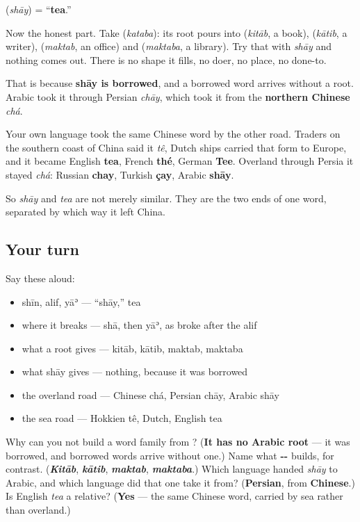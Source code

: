 \begin{cousinweb}
\textbf{} (\emph{shāy}) = \textquotedblleft{}\textbf{tea}.\textquotedblright{}

Now the honest part. Take \textbf{} (\emph{kataba}): its root pours into \textbf{} (\emph{kitāb}, a book), \textbf{} (\emph{kātib}, a writer), \textbf{} (\emph{maktab}, an office) and \textbf{} (\emph{maktaba}, a library). Try that with \emph{shāy} and nothing comes out. There is no shape it fills, no doer, no place, no done-to.

That is because \textbf{shāy is borrowed}, and a borrowed word arrives without a root. Arabic took it through Persian \emph{chāy}, which took it from the \textbf{northern Chinese} \emph{chá}.

Your own language took the same Chinese word by the other road. Traders on the southern coast of China said it \emph{tê}, Dutch ships carried that form to Europe, and it became English \textbf{tea}, French \textbf{thé}, German \textbf{Tee}. Overland through Persia it stayed \emph{chá}: Russian \textbf{chay}, Turkish \textbf{çay}, Arabic \textbf{shāy}.

So \emph{shāy} and \emph{tea} are not merely similar. They are the two ends of one word, separated by which way it left China.
\end{cousinweb}

\subsection*{Your turn}
Say these aloud:

\begin{itemize}
\raggedright
  \item shīn, alif, yāʾ — \textquotedblleft{}shāy,\textquotedblright{} tea
  \item where it breaks — shā, then yāʾ, as  broke after the alif
  \item what a root gives — kitāb, kātib, maktab, maktaba
  \item what shāy gives — nothing, because it was borrowed
  \item the overland road — Chinese chá, Persian chāy, Arabic shāy
  \item the sea road — Hokkien tê, Dutch, English tea
\end{itemize}

\begin{tcolorbox}[breakable,colback=teal!4,colframe=teal!35!black,title={Before you move on}]
Why can you not build a word family from \textbf{}? (\textbf{It has no Arabic root} — it was borrowed, and borrowed words arrive without one.) Name what \textbf{--} builds, for contrast. (\emph{\textbf{Kitāb}}, \emph{\textbf{kātib}}, \emph{\textbf{maktab}}, \emph{\textbf{maktaba}}.) Which language handed \emph{shāy} to Arabic, and which language did that one take it from? (\textbf{Persian}, from \textbf{Chinese}.) Is English \emph{tea} a relative? (\textbf{Yes} — the same Chinese word, carried by sea rather than overland.)
\end{tcolorbox}
